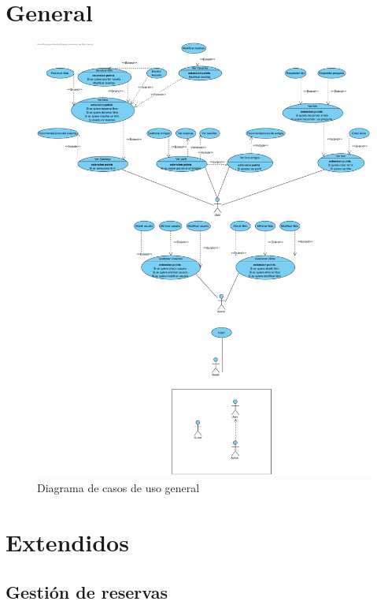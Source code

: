 \documentclass{report}
\begin{document}
        \section{General}
            \begin{figure}[H]
                \centering
                \includegraphics[scale=0.18]{img/casos_uso/General.jpg}
                \caption{Diagrama de casos de uso general}
            \end{figure}
        \clearpage
        \section{Extendidos}
        \subsection{Gestión de reservas}
        \clearpage
\end{document}
